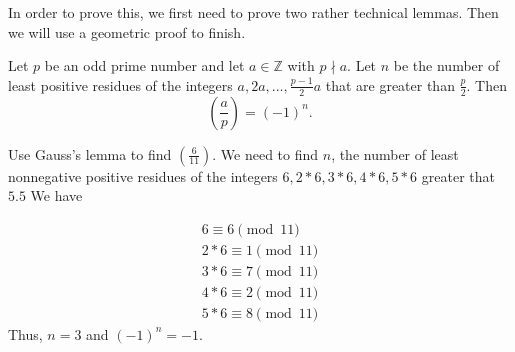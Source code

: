 \documentclass[letterpaper, 11 pt]{article}
\begin{document}
In order to prove this, we first need to prove two rather technical lemmas. Then we will use a geometric proof to finish.


\begin{lem}
Let $p$ be an odd prime number and let $a\in\mathbb{Z}$ with $p\nmid a$. Let $n$ be the number of least positive residues of the integers $a,2a,\dots, \frac{p-1}{2} a$ that are greater than $\frac{p}{2}$. Then 
\[\left(\frac{a}{p}\right)=(-1)^n.\]
\end{lem}


 Use Gauss's lemma to find $\left(\frac{6}{11}\right)$. We need to find $n$, the number of least nonnegative positive residues of the integers $6,2*6,3*6,4*6,5*6$ greater that $ {5.5}
 $
 We have 
 
\begin{align*}
 6\equiv  {6}
 \pmod{11}\\
 2*6\equiv {1}
 \pmod{11}\\
 3*6\equiv {7}
 \pmod{11}\\
 4*6\equiv {2}
 \pmod{11}\\
 5*6\equiv {8}
 \pmod{11}
\end{align*}
Thus, $n= {3}
$ and $(-1)^n= {-1}
$.
\end{document}
